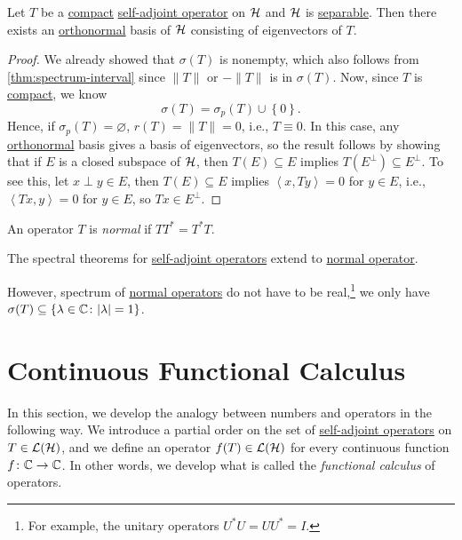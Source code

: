 \begin{theorem}\label{thm:spectral-theorem-for-compact-self-adjoint-op}
	Let \(T\) be a \hyperref[def:compact-op]{compact} \hyperref[def:self-adjoint-op]{self-adjoint operator} on \(\mathcal{\MakeUppercase{h}} \) and \(\mathcal{\MakeUppercase{h}} \) is \hyperref[def:separable]{separable}. Then there exists an \hyperref[def:orthonormal-system]{orthonormal} basis of \(\mathcal{\MakeUppercase{h}} \) consisting of eigenvectors of \(T\).
\end{theorem}
\begin{proof}
	We already showed that \(\sigma (T)\) is nonempty, which also follows from \autoref{thm:spectrum-interval} since \(\lVert T \rVert \) or \(-\lVert T \rVert \) is in \(\sigma (T)\). Now, since \(T\) is \hyperref[def:compact-op]{compact}, we know
	\[
		\sigma (T) = \sigma _p(T) \cup \left\{ 0 \right\}.
	\]
	Hence, if \(\sigma _p(T)= \varnothing \), \(r(T) = \lVert T \rVert = 0\), i.e., \(T \equiv 0\). In this case, any \hyperref[def:orthonormal-system]{orthonormal} basis gives a basis of eigenvectors, so the result follows by showing that if \(E\) is a closed subspace of \(\mathcal{\MakeUppercase{h}} \), then \(T(E) \subseteq E\) implies \(T(E^{\perp} ) \subseteq E^{\perp} \). To see this, let \(x \perp y \in E\), then \(T(E) \subseteq E\) implies \(\left\langle x, Ty \right\rangle = 0\) for \(y\in E\), i.e., \(\left\langle Tx, y \right\rangle = 0\) for \(y\in E\), so \(Tx\in E^{\perp} \).
\end{proof}

\begin{definition}\label{def:normal-op}
	An operator \(T\) is \emph{normal} if \(T T^{\ast} = T^{\ast} T\).
\end{definition}

\begin{remark}
	The spectral theorems for \hyperref[def:self-adjoint-op]{self-adjoint operators} extend to \hyperref[def:normal-op]{normal operator}.
\end{remark}

However, spectrum of \hyperref[def:normal-op]{normal operators} do not have to be real,\footnote{For example, the unitary operators \(U^{\ast} U = U U^{\ast} = I\).} we only have \(\sigma (T) \subseteq \left\{ \lambda \in \mathbb{\MakeUppercase{c}} \colon \vert \lambda  \vert =1 \right\} \).

\section{Continuous Functional Calculus}
In this section, we develop the analogy between numbers and operators in the following way. We introduce a partial order on the set of \hyperref[def:self-adjoint-op]{self-adjoint operators} on \(T\in \mathcal{\MakeUppercase{l}} (\mathcal{\MakeUppercase{h}} )\), and we define an operator \(f(T) \in \mathcal{\MakeUppercase{l}} (\mathcal{\MakeUppercase{h}} )\) for every continuous function \(f\colon \mathbb{\MakeUppercase{c}} \to \mathbb{\MakeUppercase{c}} \). In other words, we develop what is called the \emph{functional calculus} of operators.

